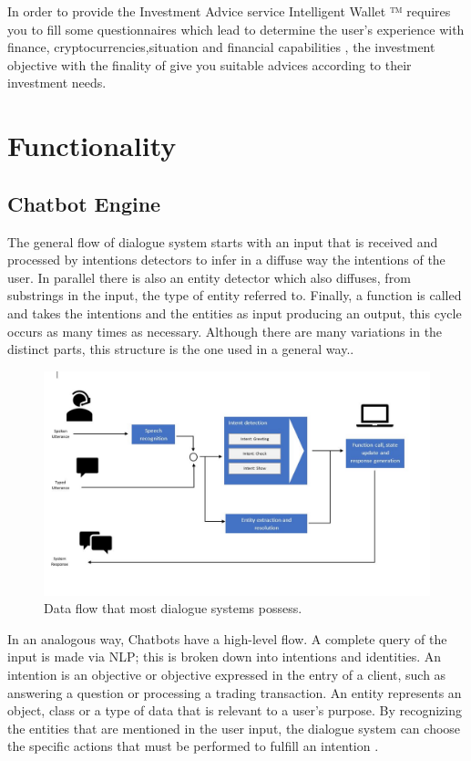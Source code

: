 \documentclass[	DIV=calc,%
							paper=letter,%
							fontsize=12pt%
                            ]{scrartcl}	 					%
\begin{document}
In order to provide the Investment Advice service Intelligent Wallet ™ requires you to fill some questionnaires  which lead to determine the user's experience with finance, cryptocurrencies,situation and financial capabilities , the investment objective with the finality of give you suitable advices according to their investment needs.




\section{\label{sec:level1}Functionality}

\subsection{\label{sec:level1}Chatbot Engine}
The general flow of dialogue system starts with an input that is received and processed by intentions detectors to infer in a diffuse way the intentions of the user. In parallel there is also an entity detector which also diffuses, from substrings in the input, the type of entity referred to. Finally, a function is called and takes the intentions and the entities as input producing an output, this cycle occurs as many times as necessary. Although there are many variations in the distinct parts, this structure is the one used in a general way.\cite{lee2015natural_sn}.


\begin{figure}[H]
\centering
\includegraphics[scale=.6]{img/Pipeline.JPG}
\caption{Data flow that most dialogue systems possess.}
\label{DiagIntent}
\end{figure}

In an analogous way, Chatbots have a high-level flow. A complete query of the input is made via NLP; this is broken down into intentions and identities. An intention is an objective or objective expressed in the entry of a client, such as answering a question or processing a trading transaction. An entity represents an object, class or a type of data that is relevant to a user's purpose. By recognizing the entities that are mentioned in the user input, the dialogue system can choose the specific actions that must be performed to fulfill an intention \cite{lee2015natural_sn} \cite{7419068Perzylo_sn}.
\end{document}
